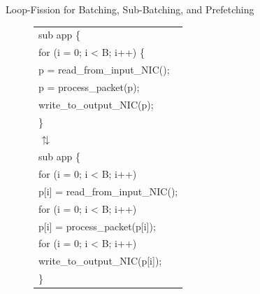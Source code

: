 \documentclass[final]{beamer}
\newlength{\sepwid}
\newlength{\onecolwid}
\newlength{\twocolwid}
\begin{document}
\begin{frame}
\begin{columns}[t]
\begin{column}{\twocolwid}
\begin{exampleblock}{Loop-Fission for Batching, Sub-Batching, and Prefetching}
\begin{multicols}{3}
\begin{figure}[ht]
\begin{tiny}
\begin{tabular}[b]{p{\onecolwid}}
sub app \{ \\
\hspace{0.2\sepwid}for (i = 0; i < B; i++) \{ \\
\hspace{0.4\sepwid}p = read\_from\_input\_NIC(); \\
\hspace{0.4\sepwid}p = process\_packet(p); \\
\hspace{0.4\sepwid}write\_to\_output\_NIC(p); \\
\hspace{0.2\sepwid}\}\\
\hspace{1\sepwid}$\updownarrows$\\
sub app \{\\
\hspace{0.2\sepwid}for (i = 0; i < B; i++)\\
\hspace{0.4\sepwid}p[i] = read\_from\_input\_NIC();\\
\hspace{0.2\sepwid}for (i = 0; i < B; i++)\\
\hspace{0.4\sepwid}p[i] = process\_packet(p[i]);\\
\hspace{0.2\sepwid}for (i = 0; i < B; i++)\\
\hspace{0.4\sepwid}write\_to\_output\_NIC(p[i]);\\
\}
\end{tabular}
\end{tiny}
\end{figure}
\begin{figure}[ht]
\begin{tiny}
\begin{tabular}[b]{p{\onecolwid}}

\end{tabular}
\end{tiny}
\end{figure}
\end{multicols}
\end{exampleblock}
\end{column}
\end{columns}
\end{frame}
\end{document}
